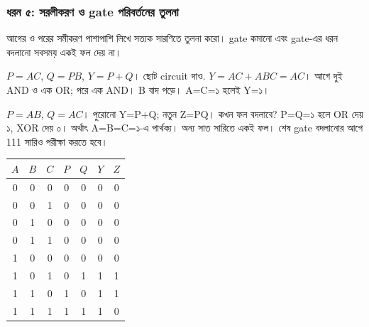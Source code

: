 \subsubsection*{ধরন ৫: সরলীকরণ ও gate পরিবর্তনের তুলনা}
আগের ও পরের সমীকরণ পাশাপাশি লিখে সত্যক সারণিতে তুলনা করো। gate কমানো এবং gate-এর ধরন বদলানো সবসময় একই ফল দেয় না।
\par\smallskip\noindent\begin{minipage}{\linewidth}
$P=AC$, $Q=PB$, $Y=P+Q$। ছোট circuit দাও.
\chThreeAnswer $Y=AC+ABC=AC$। আগে দুই AND ও এক OR; পরে এক AND। B বাদ পড়ে। A=C=১ হলেই Y=১।
\begin{center}\begin{minipage}{\linewidth}\centering
\begin{chThreeDiagram}\end{chThreeDiagram}
\label{LG018}
\end{minipage}\end{center}

\end{minipage}\par\smallskip
\par\smallskip\noindent\begin{minipage}{\linewidth}
$P=AB$, $Q=AC$। পুরোনো Y=P+Q; নতুন Z=P\oplus Q। কখন ফল বদলাবে?
\chThreeAnswer P=Q=১ হলে OR দেয় ১, XOR দেয় ০। অর্থাৎ A=B=C=১-এ পার্থক্য। অন্য সাত সারিতে একই ফল। শেষ gate বদলানোর আগে 111 সারিও পরীক্ষা করতে হবে।
\begin{center}\begin{tabular}{|c|c|c|c|c|c|c|}\hline
$A$ & $B$ & $C$ & $P$ & $Q$ & $Y$ & $Z$\\\hline
0 & 0 & 0 & 0 & 0 & 0 & 0\\\hline
0 & 0 & 1 & 0 & 0 & 0 & 0\\\hline
0 & 1 & 0 & 0 & 0 & 0 & 0\\\hline
0 & 1 & 1 & 0 & 0 & 0 & 0\\\hline
1 & 0 & 0 & 0 & 0 & 0 & 0\\\hline
1 & 0 & 1 & 0 & 1 & 1 & 1\\\hline
1 & 1 & 0 & 1 & 0 & 1 & 1\\\hline
1 & 1 & 1 & 1 & 1 & 1 & 0\\\hline
\end{tabular}\end{center}

\end{minipage}\par\smallskip
{}
